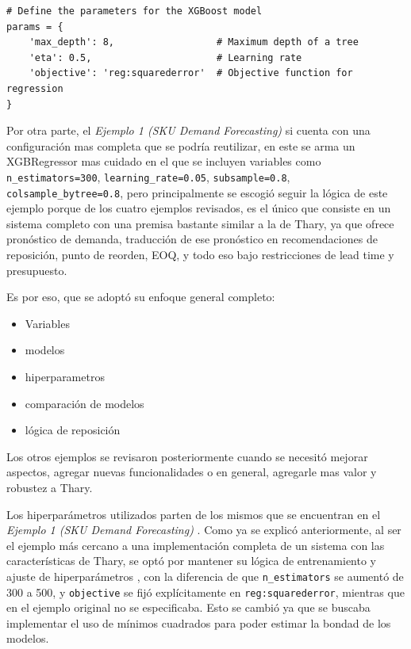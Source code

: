 \label{lst:xgboost_ejemplo3}
\begin{verbatim}
# Define the parameters for the XGBoost model
params = {
    'max_depth': 8,                  # Maximum depth of a tree
    'eta': 0.5,                      # Learning rate
    'objective': 'reg:squarederror'  # Objective function for regression
}
\end{verbatim}


Por otra parte, el \textit{Ejemplo 1 (SKU Demand Forecasting)} \cite{ejemplo1_demandforecast} si cuenta con una configuración mas completa que se podría reutilizar, en este se arma un XGBRegressor mas cuidado en el que se incluyen variables como \texttt{n\_estimators=300}, \texttt{learning\_rate=0.05}, \texttt{subsample=0.8}, \texttt{colsample\_bytree=0.8}, pero principalmente se escogió seguir la lógica de este ejemplo porque de los cuatro ejemplos revisados, es el único que consiste en un sistema completo con una premisa bastante similar a la de Thary, ya que ofrece pronóstico de demanda, traducción de ese pronóstico en recomendaciones de reposición, punto de reorden, EOQ, y todo eso bajo restricciones de lead time y presupuesto.

Es por eso, que se adoptó su enfoque general completo:

\begin{itemize}
    \item Variables
    \item modelos
    \item hiperparametros
    \item comparación de modelos
    \item lógica de reposición
\end{itemize}

Los otros ejemplos se revisaron posteriormente cuando se necesitó mejorar aspectos, agregar nuevas funcionalidades o en general, agregarle mas valor y robustez a Thary.

Los hiperparámetros utilizados parten de los mismos que se encuentran en el \textit{Ejemplo 1 (SKU Demand Forecasting)} \cite{ejemplo1_demandforecast}. Como ya se explicó anteriormente, al ser el ejemplo más cercano a una implementación completa de un sistema con las características de Thary, se optó por mantener su lógica de entrenamiento y ajuste de hiperparámetros , con la diferencia de que \texttt{n\_estimators} se aumentó de 300 a 500, y \texttt{objective} se fijó explícitamente en \texttt{reg:squarederror}, mientras que en el ejemplo original no se especificaba. Esto se cambió ya que se buscaba implementar el uso de mínimos cuadrados para poder estimar la bondad de los modelos.

